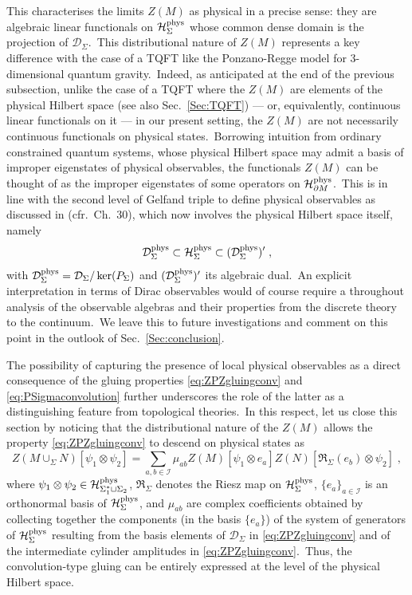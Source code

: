 \documentclass[11pt]{article}
\newcommand{\be}{\begin{equation}}
\newcommand{\ee}{\end{equation}}
\newcommand{\Hil}{\mathcal{H}}
\newcommand{\cD}{\mathcal{D}}
\newcommand{\Hphys}{\mathcal{H}_{\Sigma}^{\rm phys}}
\newcommand{\del}{\partial}
\theoremstyle{definition}
\numberwithin{equation}{section}
\begin{document}
This characterises the limits $Z(M)$ as physical in a precise sense: they are algebraic linear functionals on $\Hphys$ whose common dense domain is the projection of $\mathcal{D}_{\Sigma}$.~This distributional nature of $Z(M)$ represents a key difference with the case of a TQFT like the Ponzano-Regge model for 3-dimensional quantum gravity.~Indeed, as anticipated at the end of the previous subsection, unlike the case of a TQFT where the $Z(M)$ are elements of the physical Hilbert space (see also Sec.~\ref{Sec:TQFT}) --- or, equivalently, continuous linear functionals on it --- in our present setting, the $Z(M)$ are not necessarily continuous functionals on physical states.~Borrowing intuition from ordinary constrained quantum systems, whose physical Hilbert space may admit a basis of improper eigenstates of physical observables, the functionals $Z(M)$ can be thought of as the improper eigenstates of some operators on $\Hil_{\del M}^{\rm phys}$.~This is in line with the second level of Gelfand triple to define physical observables as discussed in \cite{Thiemann_2007} (cfr.~Ch.~30), which now involves the physical Hilbert space itself, namely
\be
\mathcal D_{\Sigma}^{\rm phys}\subset\Hphys\subset(\mathcal D_{\Sigma}^{\rm phys})'\;,
\ee
with $\mathcal D_{\Sigma}^{\rm phys}=\cD_{\Sigma}/\ker(P_{\Sigma})$ and $(\mathcal D_{\Sigma}^{\rm phys})'$ its algebraic dual.~An explicit interpretation in terms of Dirac observables would of course require a throughout analysis of the observable algebras and their properties from the discrete theory to the continuum.~We leave this to future investigations and comment on this point in the outlook of Sec.~\ref{Sec:conclusion}.

The possibility of capturing the presence of local physical observables as a direct consequence of the gluing properties \eqref{eq:ZPZgluingconv} and \eqref{eq:PSigmaconvolution} further underscores the role of the latter as a distinguishing feature from topological theories.~In this respect, let us close this section by noticing that the distributional nature of the $Z(M)$ allows the property \eqref{eq:ZPZgluingconv} to descend on physical states as
\be\label{eq:convonphys}
Z(M\cup_\Sigma N)[\psi_1\otimes\psi_2]=\sum_{a,b\in\mathcal I}\mu_{ab}Z(M)[\psi_1\otimes e_a]Z(N)[\mathfrak{R}_\Sigma(e_b)\otimes\psi_2]\;,
\ee
where $\psi_1\otimes \psi_2\in\mathcal{H}_{\Sigma_1^*\sqcup\Sigma_2}^{\rm phys}$, $\mathfrak{R}_{\Sigma}$ denotes the Riesz map on $\Hphys$, $\{e_a\}_{a\in\mathcal I}$ is an orthonormal basis of $\Hphys$, and $\mu_{ab}$ are complex coefficients obtained by collecting together the components (in the basis $\{e_a\}$) of the system of generators of $\Hphys$ resulting from the basis elements of $\mathcal D_{\Sigma}$ in \eqref{eq:ZPZgluingconv} and of the intermediate cylinder amplitudes in \eqref{eq:ZPZgluingconv}.~Thus, the convolution-type gluing can be entirely expressed at the level of the physical Hilbert space.
\end{document}

